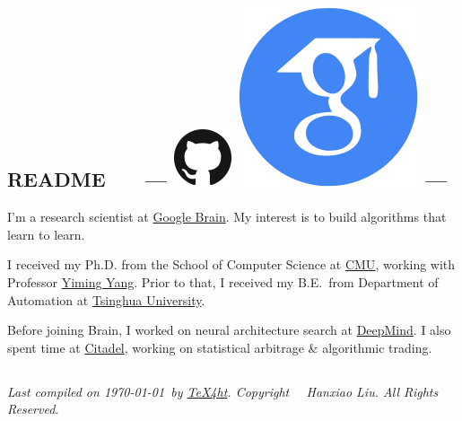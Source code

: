 \documentclass{article}
\begin{document}
\subsection*{README \ \ \ --- \protect
\href{https://github.com/quark0}{\includegraphics[natwidth=22, natheight=22]{img/GitHub-Mark-64px.png}}
\href{https://scholar.google.com/citations?user=IMkVH_8AAAAJ&hl=en}{\includegraphics[natwidth=22, natheight=22]{img/google-scholar.png}}
---
}
I'm a research scientist at \href{https://ai.google/research/teams/brain}{Google Brain}.
My interest is to build algorithms that learn to learn.

\noindent I received my Ph.D. from
the School of Computer Science at
\href{http://www.cmu.edu/index.shtml}{CMU},
working with Professor \href{http://www.cs.cmu.edu/~yiming/publications.html}{Yiming Yang}.
Prior to that,
I received my B.E.\ from
Department of Automation at
\href{http://www.tsinghua.edu.cn/publish/newthuen/index.html}{Tsinghua University}.

\noindent Before joining Brain,
I worked on neural architecture search at \href{https://deepmind.com/}{DeepMind}.
I also spent time at \href{https://www.citadel.com/}{Citadel}, working on statistical arbitrage \& algorithmic trading.

\subsection*{}
\footnotesize{
    \textit{
        Last compiled on \today\ by \href{http://www.tug.org/tex4ht/}{\TeX4ht}. \newline
        Copyright \textcopyright\ \the\year\ Hanxiao Liu. All Rights Reserved.
    }
}
\end{document}
